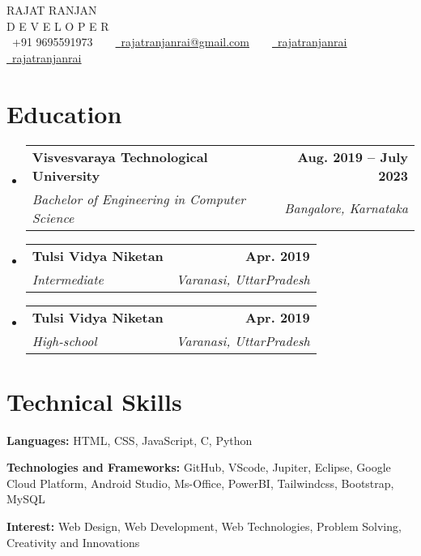 \documentclass[letterpaper,11pt]{article}
\makeatletter
\newcommand{\resumeSubheading}[4]{
  \vspace{-2pt}\item
    \begin{tabular*}{1.0\textwidth}[t]{l@{\extracolsep{\fill}}r}
      \textbf{#1} & \textbf{\small #2} \\
      \textit{\small#3} & \textit{\small #4} \\
    \end{tabular*}\vspace{-7pt}
}
\newcommand{\resumeSubHeadingListStart}{\begin{itemize}[leftmargin=0.0in, label={}]}
\newcommand{\resumeSubHeadingListEnd}{\end{itemize}}
\makeatother
\begin{document}

\begin{center}
    {\Huge \scshape RAJAT RANJAN} \\ \vspace{1pt}
    D E V E L O P E R \\ \vspace{3pt} 
    \small \raisebox{-0.1\height}\faPhone\ +91 9695591973 ~ ~ \href{mailto:rajatranjanraigmail.com}{\raisebox{-0.2\height}\faEnvelope\  \underline{rajatranjanrai@gmail.com}} ~ ~ 
    \href{https://www.linkedin.com/in/rajatranjanrai/}{\raisebox{-0.2\height}\faLinkedin\ \underline{rajatranjanrai}}  ~ ~
    \href{https://github.com/rajatranjanrai}{\raisebox{-0.2\height}\faGithub\ \underline{rajatranjanrai}}
    \vspace{-8pt}
\end{center}


\section{Education}
  \resumeSubHeadingListStart
    \resumeSubheading
      {Visvesvaraya Technological University}{Aug. 2019 -- July 2023}
      {Bachelor of Engineering in Computer Science}{Bangalore, Karnataka}
      \resumeSubheading
      {Tulsi Vidya Niketan}{Apr. 2019}
      {Intermediate}{Varanasi, UttarPradesh}
      \resumeSubheading
      {Tulsi Vidya Niketan}{Apr. 2019}
      {High-school}{Varanasi, UttarPradesh}
  \resumeSubHeadingListEnd

\section{Technical Skills}
\begin{itemize}[leftmargin=0.15in, label={}]
    \small{
        \item \textbf{Languages:} HTML, CSS, JavaScript, C, Python
        \vspace{3pt}
        \item \textbf{Technologies and Frameworks:} GitHub, VScode, Jupiter, Eclipse, Google Cloud Platform, Android Studio, Ms-Office, PowerBI, Tailwindcss, Bootstrap, MySQL
        \vspace{3pt}
        \item \textbf{Interest:} Web Design, Web Development, Web Technologies, Problem Solving, Creativity and Innovations
    }
\end{itemize}
\vspace{-10pt}
\end{document}
